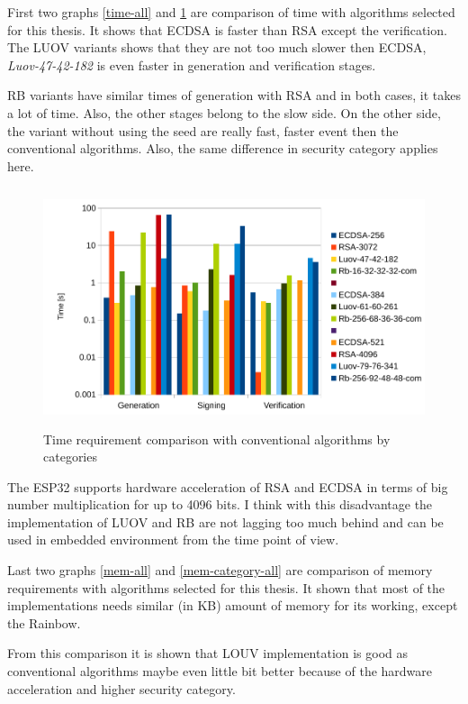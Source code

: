 \documentclass[thesis=M,english]{FITthesis}[2019/12/23]
\begin{document}
\noindent
First two graphs \ref{time-all} and \ref{time-category-all} are comparison of time with algorithms selected for this thesis. It shows that ECDSA is faster than RSA except the verification. The LUOV variants shows that they are not too much slower then ECDSA, \textit{Luov-47-42-182} is even faster in generation and verification stages.

\bigskip
\noindent
RB variants have similar times of generation with RSA and in both cases, it takes a lot of time. Also, the other stages belong to the slow side. On the other side, the variant without using the seed are really fast, faster event then the conventional algorithms. Also, the same difference in security category applies here.

\begin{figure}[H]
\centering
\includegraphics[width=13cm,height=7cm]{images/time-category-all.pdf}
\caption{Time requirement comparison with conventional algorithms by categories}
\label{time-category-all}
\end{figure}

\bigskip
\noindent
The ESP32 supports hardware acceleration of RSA and ECDSA in terms of big number multiplication for up to 4096 bits. I think with this disadvantage the implementation of LUOV and RB are not lagging too much behind and can be used in embedded environment from the time point of view.

\bigskip
\noindent
Last two graphs \ref{mem-all} and \ref{mem-category-all} are comparison of memory requirements with algorithms selected for this thesis. It shown that most of the implementations needs similar (in KB) amount of memory for its working, except the Rainbow.

\bigskip
\noindent
From this comparison it is shown that LOUV implementation is good as conventional algorithms maybe even little bit better because of the hardware acceleration and higher security category.
\end{document}
